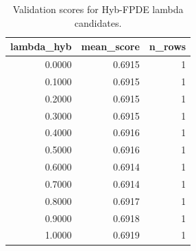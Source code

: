 \begin{table}[t]
\caption{Validation scores for Hyb-FPDE lambda candidates.}
\label{tab:lambda_distribution_computed}
\centering
\begin{tabular}{rrr}
\toprule
lambda\_hyb & mean\_score & n\_rows \\
\midrule
0.0000 & 0.6915 & 1 \\
0.1000 & 0.6915 & 1 \\
0.2000 & 0.6915 & 1 \\
0.3000 & 0.6915 & 1 \\
0.4000 & 0.6916 & 1 \\
0.5000 & 0.6916 & 1 \\
0.6000 & 0.6914 & 1 \\
0.7000 & 0.6914 & 1 \\
0.8000 & 0.6917 & 1 \\
0.9000 & 0.6918 & 1 \\
1.0000 & 0.6919 & 1 \\
\bottomrule
\end{tabular}

\end{table}
